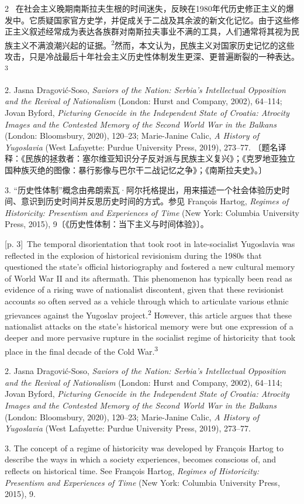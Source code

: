 \documentclass[10pt,a4paper]{article}
\begin{document}
\begin{paracol}{2}
\switchcolumn*
{\scriptsize\color{gray} [p. 3]}\ 在社会主义晚期南斯拉夫生根的时间迷失，反映在1980年代历史修正主义的爆发中。它质疑国家官方史学，并促成关于二战及其余波的新文化记忆。由于这些修正主义叙述经常成为表达各族群对南斯拉夫事业不满的工具，人们通常将其视为民族主义不满浪潮兴起的证\mbox{据。\textsuperscript{2}}然而，本文认为，民族主义对国家历史记忆的这些攻击，只是冷战最后十年社会主义历史性体制发生更深、更普遍断裂的一种表\mbox{达。\textsuperscript{3}}\par{\small 2. Jasna Dragović-Soso, \textit{Saviors of the Nation: Serbia’s Intellectual Opposition and the Revival of Nationalism} (London: Hurst and Company, 2002), 64–114; Jovan Byford, \textit{Picturing Genocide in the Independent State of Croatia: Atrocity Images and the Contested Memory of the Second World War in the Balkans} (London: Bloomsbury, 2020), 120–23; Marie-Janine Calic, \textit{A History of Yugoslavia} (West Lafayette: Purdue University Press, 2019), 273–77. 〔题名译释：《民族的拯救者：塞尔维亚知识分子反对派与民族主义复兴》；《克罗地亚独立国种族灭绝的图像：暴行影像与巴尔干二战记忆之争》；《南斯拉夫史》。〕\par}{\small 3. “历史性体制”概念由弗朗索瓦·阿尔托格提出，用来描述一个社会体验历史时间、意识到历史时间并反思历史时间的方式。参见 François Hartog, \textit{Regimes of Historicity: Presentism and Experiences of Time} (New York: Columbia University Press, 2015), 9〔《历史性体制：当下主义与时间体验》〕。\par}
\switchcolumn
{\scriptsize\color{gray} [p. 3]}\ The temporal disorientation that took root in late-socialist Yugoslavia was reflected in the explosion of historical revisionism during the 1980s that questioned the state’s official historiography and fostered a new cultural memory of World War II and its aftermath. This phenomenon has typically been read as evidence of a rising wave of nationalist discontent, given that these revisionist accounts so often served as a vehicle through which to articulate various ethnic grievances against the Yugoslav project.\nobreak\textsuperscript{2} However, this article argues that these nationalist attacks on the state’s historical memory were but one expression of a deeper and more pervasive rupture in the socialist regime of historicity that took place in the final decade of the Cold War.\nobreak\textsuperscript{3}\par{\small 2. Jasna Dragović-Soso, \textit{Saviors of the Nation: Serbia’s Intellectual Opposition and the Revival of Nationalism} (London: Hurst and Company, 2002), 64–114; Jovan Byford, \textit{Picturing Genocide in the Independent State of Croatia: Atrocity Images and the Contested Memory of the Second World War in the Balkans} (London: Bloomsbury, 2020), 120–23; Marie-Janine Calic, \textit{A History of Yugoslavia} (West Lafayette: Purdue University Press, 2019), 273–77.\par}{\small 3. The concept of a regime of historicity was developed by François Hartog to describe the ways in which a society experiences, becomes conscious of, and reflects on historical time. See François Hartog, \textit{Regimes of Historicity: Presentism and Experiences of Time} (New York: Columbia University Press, 2015), 9.\par}

\end{paracol}
\end{document}
